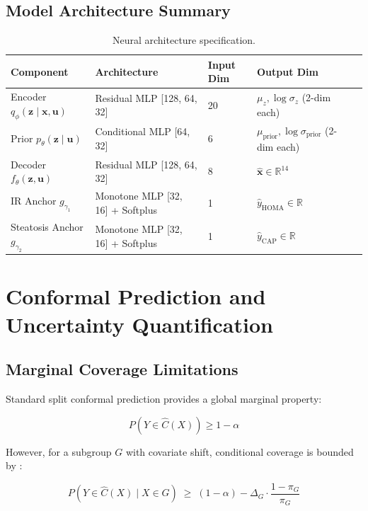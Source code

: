 \documentclass[12pt,a4paper,oneside]{report}
\begin{document}
\subsection{Model Architecture Summary}

\begin{table}[H]
\centering
\caption{Neural architecture specification.}
\label{tab:architecture}
\begin{tabular}{@{}lllll@{}}
\toprule
\textbf{Component} & \textbf{Architecture} & \textbf{Input Dim} & \textbf{Output Dim} \\ \midrule
Encoder $q_\phi(\mathbf{z} \mid \mathbf{x}, \mathbf{u})$ & Residual MLP [128, 64, 32] & 20 & $\mu_z, \log\sigma_z$ (2-dim each) \\
Prior $p_\theta(\mathbf{z} \mid \mathbf{u})$ & Conditional MLP [64, 32] & 6 & $\mu_\text{prior}, \log\sigma_\text{prior}$ (2-dim each) \\
Decoder $f_\theta(\mathbf{z}, \mathbf{u})$ & Residual MLP [128, 64, 32] & 8 & $\hat{\mathbf{x}} \in \mathbb{R}^{14}$ \\
IR Anchor $g_{\gamma_1}$ & Monotone MLP [32, 16] + Softplus & 1 & $\hat{y}_{\text{HOMA}} \in \mathbb{R}$ \\
Steatosis Anchor $g_{\gamma_2}$ & Monotone MLP [32, 16] + Softplus & 1 & $\hat{y}_{\text{CAP}} \in \mathbb{R}$ \\ \bottomrule
\end{tabular}
\end{table}

\section{Conformal Prediction and Uncertainty Quantification}

\subsection{Marginal Coverage Limitations}

Standard split conformal prediction provides a global marginal property:
\begin{equationbox}
\[
P(Y \in \hat{C}(X)) \geq 1 - \alpha
\]\vspace{-6pt}
\end{equationbox}

However, for a subgroup $G$ with covariate shift, conditional coverage is bounded by \citep{barber2023}:
\begin{equationbox}
\[
P(Y \in \hat{C}(X) \mid X \in G) \;\geq\; (1-\alpha) - \Delta_G \cdot \frac{1-\pi_G}{\pi_G}
\]\vspace{-6pt}
\end{equationbox}
\end{document}
